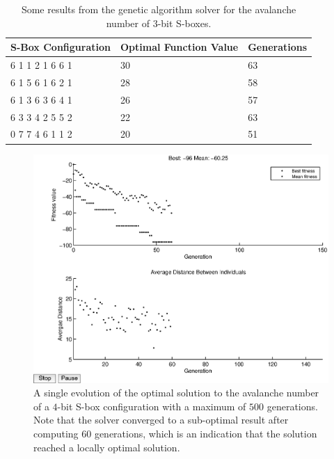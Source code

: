 \documentclass[11pt]{article}
\begin{document}
\begin{table}
	\centering
	\label{avTable}
	\caption{Some results from the genetic algorithm solver for the avalanche number of $3$-bit S-boxes.}
    \begin{tabular}{|l|l|l|}
        \hline
        S-Box Configuration & Optimal Function Value & Generations \\ \hline
        6     1     1     2     1     6     6     1 & 30 & 63 \\
        6     1     5     6     1     6     2     1 & 28 & 58 \\ 
        6     1     3     6     3     6     4     1 & 26 & 57 \\ 
	6     3     3     4     2     5     5     2 & 22 & 63 \\ 
        0     7     7     4     6     1     1     2 & 20 & 51 \\ 
        \hline
    \end{tabular}
\end{table}

\begin{figure}[!ht]
\centering
	\includegraphics[scale=0.5]{images/avalanche_results16.eps} 

	\caption{A single evolution of the optimal solution to the avalanche number of a $4$-bit S-box configuration with a maximum of $500$ generations. Note that the solver converged to a sub-optimal result after computing $60$ generations, which is an indication that the solution reached a locally optimal solution.}
	\label{av16}
\end{figure}
\end{document}
